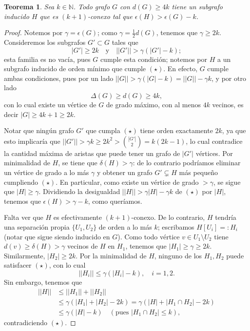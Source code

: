 \documentclass[12pt]{report}
\theoremstyle{plain}
\newtheorem{theorem}{Teorema}[section]
\theoremstyle{definition}
\newcommand{\naturals}{\mathbb{N}}
\newcommand{\abs}[1]{\left \vert #1 \right \vert}
\newcommand{\Abs}[1]{\left \vert \left \vert #1 \right \vert \right \vert}
\begin{document}
\begin{theorem}
Sea $k \in \naturals$. Todo grafo $G$ con $d(G) \geq 4 k$ tiene un subgrafo inducido $H$ que es $(k+1)$-conexo tal que $\epsilon (H) > \epsilon (G) -k$.
\end{theorem}
\begin{proof}
Notemos por $\gamma = \epsilon (G)$; como $\gamma = \frac 1 2 d(G)$, tenemos que $\gamma \geq 2 k$. Consideremos los subgrafos $G' \subset G$ tales que
\begin{equation*}
\abs{G'} \geq 2k \quad \text{y} \quad \Abs{G'}> \gamma ( \abs{G'}-k) \tag{$\star$};
\end{equation*}
esta familia es no vacía, pues $G$ cumple esta condición; notemos por $H$ a un subgrafo inducido de orden mínimo que cumple $(\star)$.
En efecto, $G$ cumple ambas condiciones, pues por un lado $\Abs G > \gamma (\abs G - k) = \Abs G - \gamma k$, y por otro lado
$$
\Delta (G) \geq d(G) \geq 4k,
$$
con lo cual existe un vértice de $G$ de grado máximo, con al menos $4k$ vecinos, es decir $\abs G \geq 4k +1 \geq 2k$.

Notar que ningún grafo $G'$ que cumpla $(\star)$ tiene orden exactamente $2k$, ya que esto implicaría que $\Abs {G'} > \gamma k \geq 2k^2 > \binom{\abs {G'}}{2} = k(2k-1)$, lo cual contradice la cantidad máxima de aristas que puede tener un grafo de $\abs{G'}$ vértices.
Por minimalidad de $H$, se tiene que $\delta (H) > \gamma$: de lo contrario podríamos eliminar un vértice de grado a lo más $\gamma$ y obtener un grafo $G' \subsetneq H$ más pequeño cumpliendo $(\star)$. En particular, como existe un vértice de grado $> \gamma$, se sigue que $\abs H \geq \gamma$. Dividiendo la desigualdad $\Abs H > \gamma \abs H - \gamma k$ de $(\star)$ por $\abs H$, tenemos que $\epsilon (H) > \gamma - k$, como queríamos.

Falta ver que $H$ es efectivamente $(k+1)$-conexo. De lo contrario, $H$ tendría una separación propia $\{U_1, U_2\}$ de orden a lo más $k$; escribamos $H[U_i] =: H_i$ (notar que sigue siendo inducido en $G$). Como todo vértice $v \in U_1 \setminus U_{2}$ tiene $d(v) \geq \delta (H) > \gamma$ vecinos de $H$ en $H_1$, tenemos que $\abs{H_1}\geq \gamma \geq 2k$. Similarmente, $\abs{H_2} \geq 2k$. Por la minimalidad de $H$, ninguno de los $H_1,H_2$ puede satisfacer $(\star)$, con lo cual
\[
\Abs {H_i} \leq \gamma (\abs{H_i}-k), \quad i = 1,2.
\]
Sin embargo, tenemos que
\begin{align*}
\Abs H &\leq \Abs {H_1} + \Abs{H_2} \\
&\leq \gamma (\abs {H_1} + \abs{H_2} -2k) = \gamma (\abs{H}+ \abs{H_1 \cap H_2}-2k) \\
&\leq \gamma (\abs H - k) \quad (\text{pues $\abs{H_1\cap H_2} \leq k$}),
\end{align*}
contradiciendo $(\star)$.
\end{proof}
\end{document}
